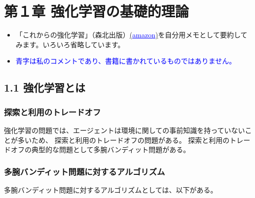 \documentclass[]{jarticle}
\begin{document}
	
\section*{第１章 強化学習の基礎的理論}

\begin{itemize}
	\item 「これからの強化学習」（森北出版）\href{https://www.amazon.co.jp/dp/4627880316}{(\textcolor{blue}{\underline{amazon}})}を自分用メモとして要約してみます。いろいろ省略しています。
	\item \textcolor{blue}{青字は私のコメントであり、書籍に書かれているものではありません。}
\end{itemize}

\subsection*{1.1 強化学習とは}

\subsubsection*{探索と利用のトレードオフ}

強化学習の問題では、エージェントは環境に関しての事前知識を持っていないことが多いため、
探索と利用のトレードオフの問題がある。
探索と利用のトレードオフの典型的な問題として多腕バンディット問題がある。

\subsubsection*{多腕バンディット問題に対するアルゴリズム}
多腕バンディット問題に対するアルゴリズムとしては、以下がある。
\end{document}
